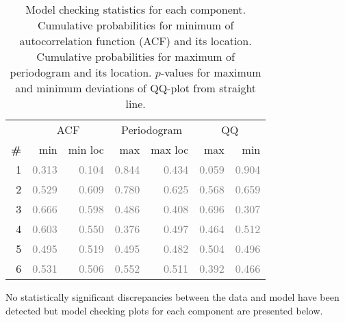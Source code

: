 \documentclass{article} %
\begin{document}
\begin{table}[htb]
\begin{center}
{\small
\begin{tabular}{|r|rr|rr|rr|}
\hline
 & \multicolumn{2}{|c|}{ACF} & \multicolumn{2}{|c|}{Periodogram} & \multicolumn{2}{|c|}{QQ} \\
\bf{\#} & {min} & {min loc} & {max} & {max loc} & {max} & {min}\\
\hline

1 & \textcolor{gray}{0.313} & \textcolor{gray}{0.104} & \textcolor{gray}{0.844} & \textcolor{gray}{0.434} & \textcolor{gray}{0.059} & \textcolor{gray}{0.904}\\

2 & \textcolor{gray}{0.529} & \textcolor{gray}{0.609} & \textcolor{gray}{0.780} & \textcolor{gray}{0.625} & \textcolor{gray}{0.568} & \textcolor{gray}{0.659}\\

3 & \textcolor{gray}{0.666} & \textcolor{gray}{0.598} & \textcolor{gray}{0.486} & \textcolor{gray}{0.408} & \textcolor{gray}{0.696} & \textcolor{gray}{0.307}\\

4 & \textcolor{gray}{0.603} & \textcolor{gray}{0.550} & \textcolor{gray}{0.376} & \textcolor{gray}{0.497} & \textcolor{gray}{0.464} & \textcolor{gray}{0.512}\\

5 & \textcolor{gray}{0.495} & \textcolor{gray}{0.519} & \textcolor{gray}{0.495} & \textcolor{gray}{0.482} & \textcolor{gray}{0.504} & \textcolor{gray}{0.496}\\

6 & \textcolor{gray}{0.531} & \textcolor{gray}{0.506} & \textcolor{gray}{0.552} & \textcolor{gray}{0.511} & \textcolor{gray}{0.392} & \textcolor{gray}{0.466}\\

\hline
\end{tabular}
\caption{
Model checking statistics for each component.
Cumulative probabilities for minimum of autocorrelation function (ACF) and its location.
Cumulative probabilities for maximum of periodogram and its location.
$p$-values for maximum and minimum deviations of QQ-plot from straight line.
}
\label{table:check}
}
\end{center}
\end{table}

No statistically significant discrepancies between the data and model have been detected but model checking plots for each component are presented below.
\end{document}
